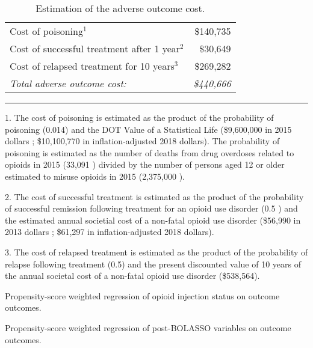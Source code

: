 \documentclass[9pt,twoside]{pnas-new}
\begin{document}
\begin{table}
\caption{Estimation of the adverse outcome cost.}
\centering
\begin{tabular}{lr}
Cost of poisoning$^1$ & \$140,735 \\
Cost of successful treatment after 1 year$^2$ & \$30,649 \\
Cost of relapsed treatment for 10 years$^3$ & \$269,282 \\
\hline
\em Total adverse outcome cost: & \em \$440,666 \\[1em]
\end{tabular}
\hrule
\begin{tablenotes}
\footnotesize
\item 1. The cost of poisoning is estimated as the product of the probability of poisoning (0.014) and the DOT Value of a Statistical Life (\$9,600,000 in 2015 dollars \cite{vsl}; \$10,100,770 in inflation-adjusted 2018 dollars). The probability of poisoning is estimated as the number of deaths from drug overdoses related to opioids in 2015 (33,091 \cite{nida1}) divided by the number of persons aged 12 or older estimated to misuse opioids in 2015 (2,375,000 \cite{nida2}).
\item 2. The cost of successful treatment is estimated as the product of the probability of successful remission following treatment for an opioid use disorder (0.5 \cite{weiss}) and the estimated annual societial cost of a non-fatal opioid use disorder (\$56,990 in 2013 dollars \cite{florence}; \$61,297 in inflation-adjusted 2018 dollars).
\item 3. The cost of relapsed treatment is estimated as the product of the probability of relapse following treatment (0.5) and the present discounted value of 10 years of the annual societal cost of a non-fatal opioid use disorder (\$538,564).
\end{tablenotes}
\end{table}

\begin{table}
\caption{Propensity-score weighted regression of opioid injection status on outcome outcomes.}
\centering
\small

\end{table}

\begin{table}
\caption{Propensity-score weighted regression of post-BOLASSO variables on outcome outcomes.}
\centering
\small

\end{table}
\end{document}
